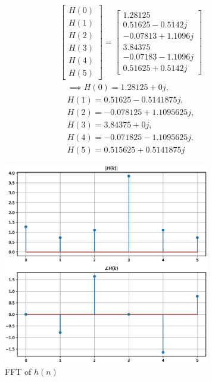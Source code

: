 \documentclass[journal,12pt,twocolumn]{IEEEtran}
\renewcommand\thesection{\arabic{section}}
\begin{document}
\begin{enumerate}[label=\thesection.\arabic*.,ref=\thesection.\theenumi]
\begin{align}
\begin{bmatrix} 
H(0) \\ 
H(1) \\ 
H(2) \\ 
H(3) \\ 
H(4) \\ 
H(5) 
\end{bmatrix}
=
\begin{bmatrix}
1.28125 \\
0.51625-0.5142j \\ 
-0.07813+1.1096j  \\ 
3.84375 \\ 
-0.07183-1.1096j \\ 
0.51625+0.5142j
\end{bmatrix}
\end{align}
\begin{align}
\implies H(0) = 1.28125 + 0j,\\
 H(1) = 0.51625 - 0.5141875j,\\
 H(2) = -0.078125 + 1.1095625j,\\
 H(3) = 3.84375 + 0j,\\
 H(4) = -0.071825 - 1.1095625j.\\
 H(5) = 0.515625 + 0.5141875j
\end{align}

\begin{figure}[h!]
    \centering
    \includegraphics[width=9cm]{./figs/ee18btech11029_4.eps}
    \caption{FFT of $h(n)$}
    \label{yn}
\end{figure}


\end{enumerate}
\end{document}
